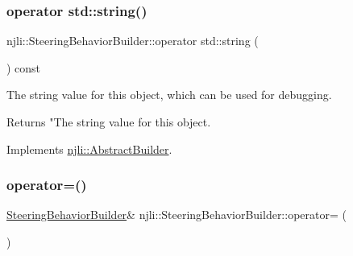 \subsubsection{\texorpdfstring{operator std\+::string()}{operator std::string()}}
{\footnotesize\ttfamily njli\+::\+Steering\+Behavior\+Builder\+::operator std\+::string (\begin{DoxyParamCaption}{ }\end{DoxyParamCaption}) const\hspace{0.3cm}{\ttfamily [virtual]}}

The string value for this object, which can be used for debugging.

\begin{DoxyReturn}{Returns}
"The string value for this object. 
\end{DoxyReturn}


Implements \mbox{\hyperlink{classnjli_1_1_abstract_builder_a3e6e553e06d1ca30517ad5fb0bd4d000}{njli\+::\+Abstract\+Builder}}.

\mbox{\label{classnjli_1_1_steering_behavior_builder_a7b782750f974aeb6cf64b009b6120aa2}} 
\subsubsection{\texorpdfstring{operator=()}{operator=()}}
{\footnotesize\ttfamily \mbox{\hyperlink{classnjli_1_1_steering_behavior_builder}{Steering\+Behavior\+Builder}}\& njli\+::\+Steering\+Behavior\+Builder\+::operator= (\begin{DoxyParamCaption}\item[{const \mbox{\hyperlink{classnjli_1_1_steering_behavior_builder}{Steering\+Behavior\+Builder}} \&}]{ }\end{DoxyParamCaption})\hspace{0.3cm}{\ttfamily [protected]}}

\mbox{\label{classnjli_1_1_steering_behavior_builder_ac94c6252483326df2f7d8a1551159858}} 
